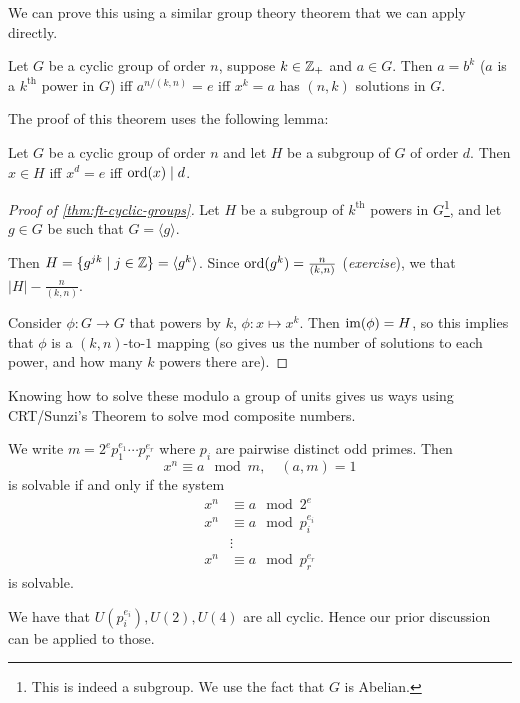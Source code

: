 We can prove this using a similar group theory theorem that we can apply directly.
\begin{theorem}\label{thm:ft-cyclic-groups}
    Let $G$ be a cyclic group of order $n$, suppose $k\in\mathbb Z_+$ and $a\in G$. Then $a=b^k$ ($a$ is a $k^\mathrm{th}$ power in $G$) iff $a^{n/(k,n)} = e$ iff $x^k = a$ has $(n, k)$ solutions in $G$.
\end{theorem}

The proof of this theorem uses the following lemma:
\begin{lemma}
    Let $G$ be a cyclic group of order $n$ and let $H$ be a subgroup of $G$ of order $d$. Then $x\in H$ iff $x^d = e$ iff $\operatorname{ord}(x)\mid d$.
\end{lemma}

\begin{proof}[Proof of \cref{thm:ft-cyclic-groups}]
    Let $H$ be a subgroup of $k^\mathrm{th}$ powers in $G$\footnote{This is indeed a subgroup. We use the fact that $G$ is Abelian.}, and let $g\in G$ be such that $G = \langle g\rangle$.

    Then $H = \{g^{jk}\mid j\in \mathbb Z\} = \langle g^k\rangle$. Since $\operatorname{ord}(g^k) = \frac{n}{(k, n)}$ (\emph{exercise}), we that $|H| - \frac{n}{(k,n)}$.

    Consider $\phi: G\to G$ that powers by $k$, $\phi: x\mapsto x^k$. Then $\operatorname{im}(\phi) = H$, so this implies that $\phi$ is a $(k, n)$-to-$1$ mapping (so gives us the number of solutions to each power, and how many $k$ powers there are).
\end{proof}

Knowing how to solve these modulo a group of units gives us ways using CRT/Sunzi's Theorem to solve mod composite numbers.

We write $m = 2^ep_1^{e_1}\cdots p_r^{e_r}$ where $p_i$ are pairwise distinct odd primes. Then
\[x^n\equiv a\mod m, \quad (a, m) = 1\]
is solvable if and only if the system
\begin{align*}
    x^n & \equiv a\mod 2^e       \\
    x^n & \equiv a\mod p_i^{e_i} \\
        & \vdots                 \\
    x^n & \equiv a\mod p_r^{e_r}
\end{align*}
is solvable.

We have that $U(p_i^{e_i}), U(2), U(4)$ are all cyclic. Hence our prior discussion can be applied to those.

